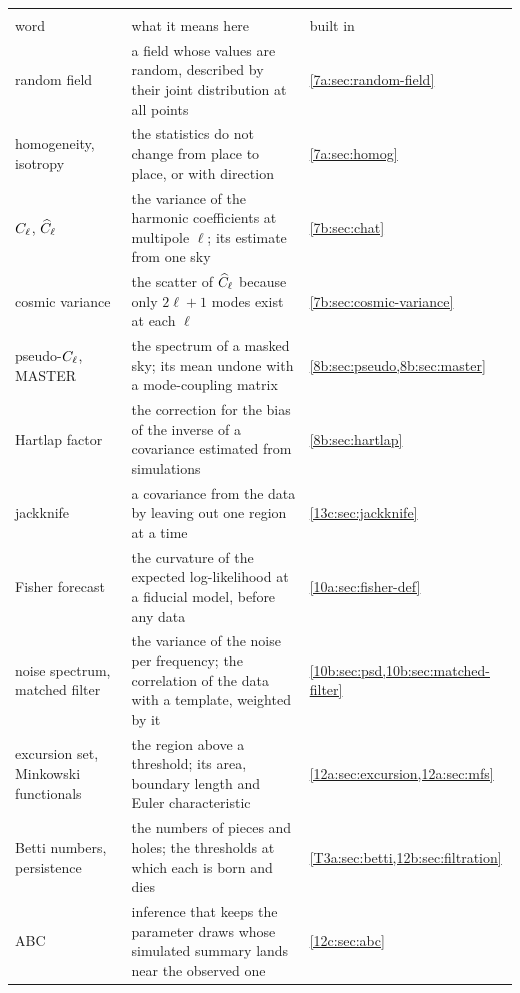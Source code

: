 \begin{center}
\small
\renewcommand{\arraystretch}{1.18}
\begin{tabularx}{\linewidth}{@{}>{\raggedright\arraybackslash}p{3.0cm}
                               >{\raggedright\arraybackslash}X
                               >{\raggedright\arraybackslash}p{2.0cm}@{}}
\toprule
\multicolumn{3}{@{}l}{\textbf{Fields, forecasts and summaries}}\\
word & what it means here & built in\\\midrule
random field & a field whose values are random, described by their joint distribution at all points & \cref{7a:sec:random-field}\\
homogeneity, isotropy & the statistics do not change from place to place, or with direction & \cref{7a:sec:homog}\\
$C_\ell$, $\widehat{C}_\ell$ & the variance of the harmonic coefficients at multipole $\ell$; its estimate from one sky & \cref{7b:sec:chat}\\
cosmic variance & the scatter of $\widehat{C}_\ell$ because only $2\ell+1$ modes exist at each $\ell$ & \cref{7b:sec:cosmic-variance}\\
pseudo-$C_\ell$, MASTER & the spectrum of a masked sky; its mean undone with a mode-coupling matrix & \cref{8b:sec:pseudo,8b:sec:master}\\
Hartlap factor & the correction for the bias of the inverse of a covariance estimated from simulations & \cref{8b:sec:hartlap}\\
jackknife & a covariance from the data by leaving out one region at a time & \cref{13c:sec:jackknife}\\
Fisher forecast & the curvature of the expected log-likelihood at a fiducial model, before any data & \cref{10a:sec:fisher-def}\\
noise spectrum, matched filter & the variance of the noise per frequency; the correlation of the data with a template, weighted by it & \cref{10b:sec:psd,10b:sec:matched-filter}\\
excursion set, Minkowski functionals & the region above a threshold; its area, boundary length and Euler characteristic & \cref{12a:sec:excursion,12a:sec:mfs}\\
Betti numbers, persistence & the numbers of pieces and holes; the thresholds at which each is born and dies & \cref{T3a:sec:betti,12b:sec:filtration}\\
ABC & inference that keeps the parameter draws whose simulated summary lands near the observed one & \cref{12c:sec:abc}\\
\bottomrule
\end{tabularx}
\end{center}

